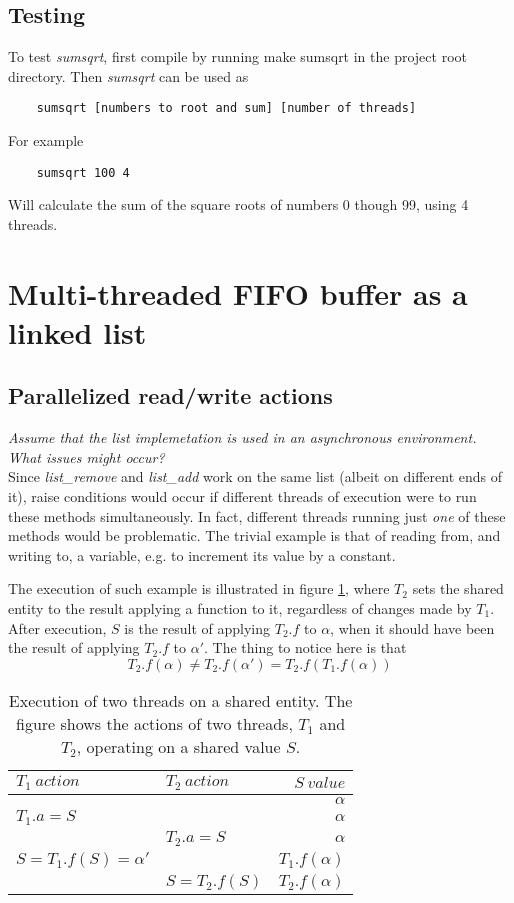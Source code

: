 \documentclass[a4paper, titlepage]{article}
\begin{document}
\subsection*{Testing}
To test \emph{sumsqrt}, first compile by running make sumsqrt in the project root
directory. Then \emph{sumsqrt} can be used as
\begin{verbatim}
	sumsqrt [numbers to root and sum] [number of threads]
\end{verbatim}
For example
\begin{verbatim}
	sumsqrt 100 4
\end{verbatim}
Will calculate the sum of the square roots of numbers 0 though 99, using 4
threads.

\section*{Multi-threaded FIFO buffer as a linked list}
\subsection{Parallelized read/write actions}
\textit{Assume that the list implemetation is used in an asynchronous
environment. What issues might occur?}\\

Since \emph{list\_remove} and \emph{list\_add} work on the same list (albeit on
different ends of it), raise conditions would occur if different threads of
execution were to run these methods simultaneously. In fact, different threads
running just \textit{one} of these methods would be problematic. The trivial
example is that of reading from, and writing to, a variable, e.g. to increment
its value by a constant.

The execution of such example is illustrated in figure
\ref{tab:threadaccess}, where $T_2$ sets the shared entity to the result
applying a function to it, regardless of changes made by $T_1$. After
execution, $S$ is the result of applying $T_2.f$ to $\alpha$, when it should
have been the result of applying $T_2.f$ to $\alpha'$. The thing to notice here
is that $$T_2.f(\alpha) \neq T_2.f(\alpha') = T_2.f(T_1.f(\alpha))$$

\begin{table}[hbtp]
	\centering
	\begin{tabular}{|l|l|r|}
		\hline
		$T_1\ action$&$T_2\ action$&$S\ value$\\
		\hline
		&&$\alpha$\\
		\hline
		$T_1.a = S$&&$\alpha$\\
		\hline
		&$T_2.a = S$&$\alpha$\\
		\hline
		$S = T_1.f(S) = \alpha'$&&$T_1.f(\alpha)$\\
		\hline
		&$S = T_2.f(S)$&$T_2.f(\alpha)$\\
		\hline
	\end{tabular}
	\caption{
		Execution of two threads on a shared entity. The figure shows
		the actions of two threads, $T_1$ and $T_2$, operating on a
		shared value $S$.
		\label{tab:threadaccess}
	}
\end{table}
\end{document}
